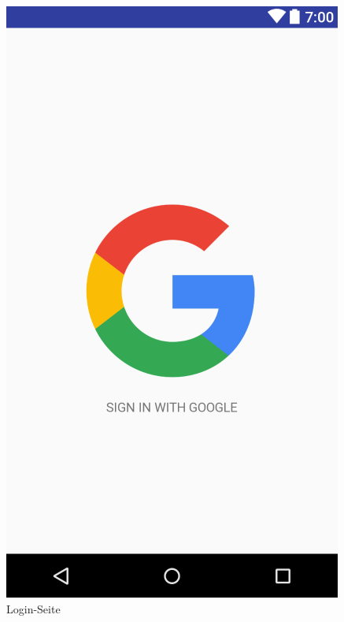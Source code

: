 \documentclass[parskip=full]{scrartcl}
\begin{document}
\begin{figure}[H]
  \vspace{1cm}
  \centering
  \begin{minipage}[b]{0.4\textwidth}
    \includegraphics[width=\textwidth]{GUI/AndroidStudio/login_simple.PNG}
	\caption{Login-Seite}\label{login}	
  \end{minipage}
  \hfill
  \begin{minipage}[b]{0.4\textwidth}

\end{minipage}
\end{figure}
\end{document}
